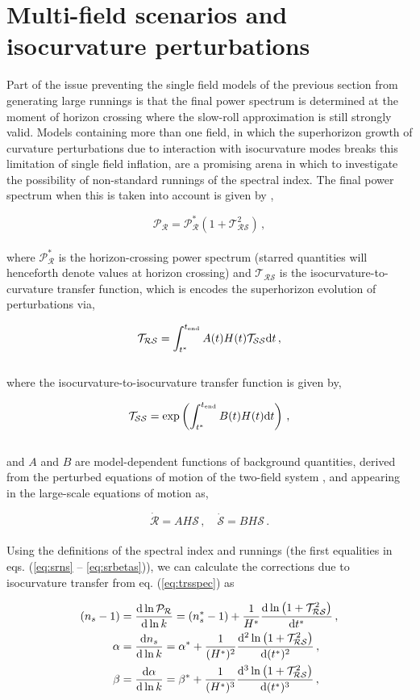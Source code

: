 \documentclass[universe,preprints,oneauthor,pdftex,10pt,a4paper]{mdpi}
\newcommand{\beq}{\begin{equation}}
\newcommand{\eeq}{\end{equation}\\}
\newcommand{\rpar}[1]{\left(#1\right)}
\newcommand{\bd}{{\rm d}}
\newcommand{\TRS}{\mathcal{T}_\mathcal{RS}}
\newcommand{\TSS}{\mathcal{T}_\mathcal{SS}}
\begin{document}
\section{Multi-field scenarios and isocurvature perturbations}

Part of the issue preventing the single field models of the previous section from generating large runnings is that the final power spectrum is determined at the moment of horizon crossing where the slow-roll approximation is still strongly valid. Models containing more than one field, in which the superhorizon growth of curvature perturbations due to interaction with isocurvature modes breaks this limitation of single field inflation, are a promising arena in which to investigate the possibility of non-standard runnings of the spectral index. The final power spectrum when this is taken into account is given by \cite{Wands:2002bn,Ashoorioon:2008qr,Lalak:2007vi},

\beq
\mathcal{P}_\mathcal{R} = \mathcal{P}_\mathcal{R}^* \rpar{1 + \TRS^2} \, , \label{eq:trsspec}
\eeq

where $\mathcal{P}_\mathcal{R}^*$ is the horizon-crossing power spectrum (starred quantities will henceforth denote values at horizon crossing) and $\TRS$ is the isocurvature-to-curvature transfer function, which is encodes the superhorizon evolution of perturbations via,

\beq
\TRS = \int_{t^*}^{t_\text{end}} A(t) H(t) \TSS \bd t \, , \label{eq:TRSdef}
\eeq

where the isocurvature-to-isocurvature transfer function is given by,

\beq
\TSS = \exp\rpar{\int_{t^*}^{t_\text{end}} B(t) H(t) \bd t} \, , \label{eq:TSSdef}
\eeq

and $A$ and $B$ are model-dependent functions of background quantities, derived from the perturbed equations of motion of the two-field system \cite{DiMarco:2002eb,DiMarco:2005nq,vandeBruck:2014ata}, and appearing in the large-scale equations of motion as,

\beq
\dot{\mathcal{R}} = A H \mathcal{S} \, , \quad \dot{\mathcal{S}} = B H \mathcal{S} \, .
\eeq

Using the definitions of the spectral index and runnings (the first equalities in eqs. (\ref{eq:srns} -- \ref{eq:srbetas})), we can calculate the corrections due to isocurvature transfer from eq. (\ref{eq:trsspec}) as

\begin{align}
\rpar{n_s - 1} & = \frac{\bd \ln \mathcal{P}_\mathcal{R}}{ \bd \ln k} = \rpar{n_s^* - 1} + \frac{1}{H^*} \frac{\bd \ln \rpar{1+\TRS^2}}{\bd t^*}  \, , \\
\alpha & = \frac{\bd n_s}{\bd \ln k} = \alpha^* + \frac{1}{(H^*)^2} \frac{\bd^2 \ln \rpar{1+\TRS^2}}{\bd (t^*)^2} \, , \\
\beta & = \frac{\bd \alpha}{\bd \ln k} = \beta^* +  \frac{1}{(H^*)^3} \frac{\bd^3 \ln \rpar{1+\TRS^2}}{\bd (t^*)^3} \, ,
\end{align}
\end{document}
